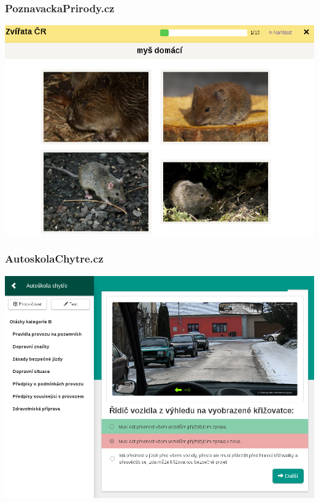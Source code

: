 \documentclass[xcolor=svgnames]{beamer}
\begin{document}
\begin{frame}
	\frametitle{PoznavackaPrirody.cz}
   \includegraphics[width=\textwidth]{img/poznavackaprirody}
\end{frame}
\begin{frame}
	\frametitle{AutoskolaChytre.cz}
   \includegraphics[width=\textwidth]{img/autoskola}
\end{frame}
\end{document}
